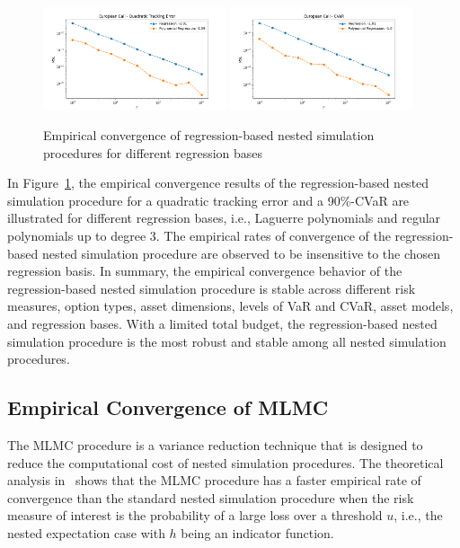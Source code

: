 \begin{figure}[ht!] 
    \centering
    \includegraphics[width=0.48\textwidth]{./project1/figures/figure13a.png}
    \includegraphics[width=0.48\textwidth]{./project1/figures/figure13b.png}
    \caption{Empirical convergence of regression-based nested simulation procedures for different regression bases}
    \label{fig1:sens_basis}
\end{figure}

In Figure~\ref{fig1:sens_basis}, the empirical convergence results of the regression-based nested simulation procedure for a quadratic tracking error and a 90\%-CVaR are illustrated for different regression bases, i.e., Laguerre polynomials and regular polynomials up to degree $3$.
The empirical rates of convergence of the regression-based nested simulation procedure are observed to be insensitive to the chosen regression basis.
In summary, the empirical convergence behavior of the regression-based nested simulation procedure is stable across different risk measures, option types, asset dimensions, levels of VaR and CVaR, asset models, and regression bases.
With a limited total budget, the regression-based nested simulation procedure is the most robust and stable among all nested simulation procedures. 

\subsection{Empirical Convergence of MLMC} \label{sec1:empirical-mlmc}

The MLMC procedure is a variance reduction technique that is designed to reduce the computational cost of nested simulation procedures.
The theoretical analysis in~\cite{giles2019multilevel} shows that the MLMC procedure has a faster empirical rate of convergence than the standard nested simulation procedure when the risk measure of interest is the probability of a large loss over a threshold $u$, i.e., the nested expectation case with $h$ being an indicator function.

